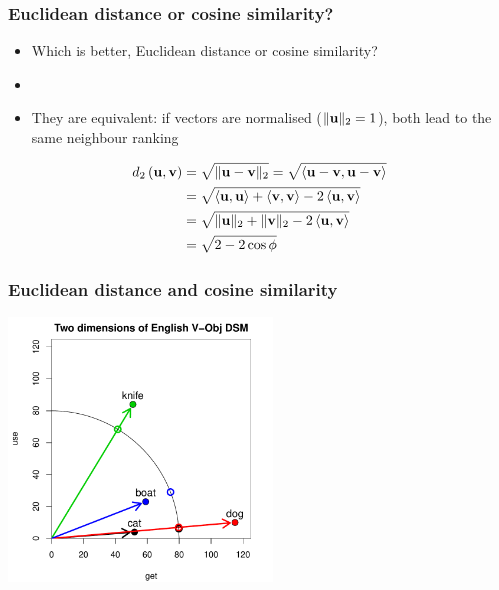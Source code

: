 \begin{frame}[fragile]
  \frametitle{Euclidean distance or cosine similarity?}

  \begin{itemize}
  \item Which is better, Euclidean distance or cosine similarity?
  \item[]
  \item<2-> They are equivalent: if vectors are normalised ($\norm[2]{\vu} = 1$),
    both lead to the same neighbour ranking
  \end{itemize}

  \begin{align*}
    \dist[2]{\vu}{\vv} 
    &= \sqrt{\norm[2]{\vu - \vv}}
    = \sqrt{\sprod{\vu - \vv}{\vu - \vv}}
    \\
    &= \sqrt{\sprod{\vu}{\vu} + \sprod{\vv}{\vv} - 2 \sprod{\vu}{\vv}}
    \\
    &= \sqrt{\norm[2]{\vu} + \norm[2]{\vv} - 2 \sprod{\vu}{\vv}}
    \\
    &= \sqrt{2 - 2 \cos \phi}
  \end{align*}
\end{frame}

\begin{frame}[c]
  \frametitle{Euclidean distance and cosine similarity}

  \begin{center}
    \includegraphics[width=7cm]{img/hieroglyph_2d_4}
  \end{center}
\end{frame}


